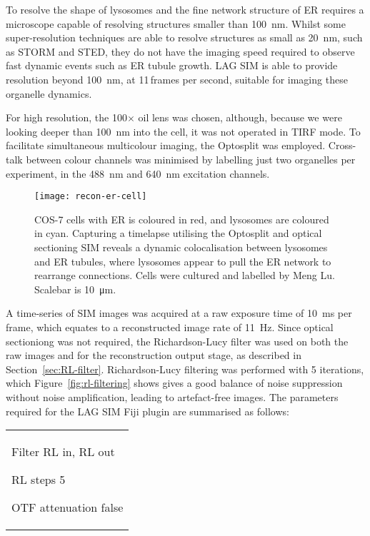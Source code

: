 To resolve the shape of lysosomes and the fine network structure of ER requires a microscope capable of resolving structures smaller than \SI{100}{\nano\metre}.
Whilst some super-resolution techniques are able to resolve structures as small as \SI{20}{\nano\metre}, such as STORM and STED, they do not have the imaging speed required to observe fast dynamic events such as ER tubule growth.
LAG SIM is able to provide resolution beyond \SI{100}{\nano\metre}, at 11\,frames per second, suitable for imaging these organelle dynamics.

For high resolution, the 100$\times$ oil lens was chosen, although, because we were looking deeper than \SI{100}{\nano\metre} into the cell, it was not operated in TIRF mode.
To facilitate simultaneous multicolour imaging, the Optosplit was employed.
Cross-talk between colour channels was minimised by labelling just two organelles per experiment, in the \SI{488}{\nano\metre} and \SI{640}{\nano\metre} excitation channels.

\begin{figure}[tbp!]
\centering
\texttt{[image: recon-er-cell]}
\caption[LAG SIM: Fast, multicolour imaging of ER in cells reveals co-localisation between lysosomes and ER tubules]{COS-7 cells with ER is coloured in red, and lysosomes are coloured in cyan. Capturing a timelapse utilising the Optosplit and optical sectioning SIM reveals a dynamic colocalisation between lysosomes and ER tubules, where lysosomes appear to pull the ER network to rearrange connections. Cells were cultured and labelled by Meng Lu. Scalebar is \SI{10}{\micro\metre}. }
\label{fig:recon-er-cell}
\end{figure}
\afterpage{\clearpage}

A time-series of SIM images was acquired at a raw exposure time of \SI{10}{\milli\second} per frame, which equates to a reconstructed image rate of \SI{11}{\hertz}.
Since optical sectioniong was not required, the Richardson-Lucy filter was used on both the raw images and for the reconstruction output stage, as described in Section~\ref{sec:RL-filter}.
Richardson-Lucy filtering was performed with 5 iterations, which Figure~\ref{fig:rl-filtering} shows gives a good balance of noise suppression without noise amplification, leading to artefact-free images.
The parameters required for the LAG SIM Fiji plugin are summarised as follows:
\newline
\begin{tabular}{p{}}
\begin{labelling}[margin=OTF attenuation]
	\item[Filter] RL in, RL out
	\item[RL steps] 5
	\item[OTF attenuation] false
\end{labelling}
\end{tabular}

